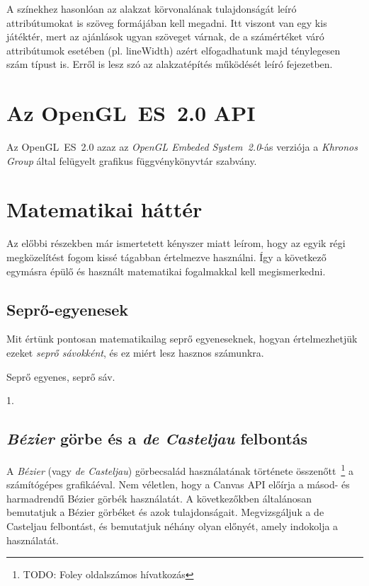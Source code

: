 \documentclass[12pt]{report}
\theoremstyle{definition}
\newcommand{\func}[1]{{\textsf{\footnotesize{#1}}}}
\begin{document}
A színekhez hasonlóan az alakzat körvonalának tulajdonságát leíró
attribútumokat is szöveg formájában kell megadni. Itt viszont van egy kis
játéktér, mert az ajánlások ugyan szöveget várnak, de a számértéket
váró attribútumok esetében (pl. \func{lineWidth}) azért elfogadhatunk majd
ténylegesen szám típust is. Erről is lesz szó az alakzatépítés
működését leíró fejezetben.

    \section[GLES2 API]{Az OpenGL~ES~2.0 API}
    \label{GLES2 API}

Az OpenGL~ES~2.0 azaz az \emph{OpenGL Embeded System~2.0}-ás verziója a
\emph{Khronos Group} által felügyelt grafikus függvénykönyvtár szabvány.

    \section[Matematikai háttér]{Matematikai háttér}
    \label{Matematikai háttér}

Az előbbi részekben már ismertetett kényszer miatt leírom, hogy az egyik régi
megközelítést fogom kissé tágabban értelmezve használni. Így a következő
egymásra épülő és használt matematikai fogalmakkal kell megismerkedni.

    \subsection*{Seprő-egyenesek}
    \label{Seprő-egyenesek}

Mit értünk pontosan matematikailag seprő egyeneseknek, hogyan értelmezhetjük
ezeket \emph{seprő sávokként}, és ez miért lesz hasznos számunkra.

  \begin{description}[noitemsep]
    \item[Kulcsszavak] Seprő egyenes, seprő sáv.
    \item[Becsült oldalszám] 1.
  \end{description}

    \subsection*{\emph{Bézier} görbe és a \emph{de Casteljau} felbontás}
    \label{Bézier görbe és a de Casteljau felbontás}

A \emph{Bézier} (vagy \emph{de Casteljau}) görbecsalád használatának története
összenőtt~\footnote{TODO: Foley oldalszámos hívatkozás} a számítógépes
grafikáéval. Nem véletlen, hogy a Canvas API előírja a másod- és harmadrendű
Bézier görbék használatát. A következőkben általánosan bemutatjuk a
Bézier görbéket és azok tulajdonságait. Megvizsgáljuk a de Casteljau felbontást,
és bemutatjuk néhány olyan előnyét, amely indokolja a használatát.
\end{document}
